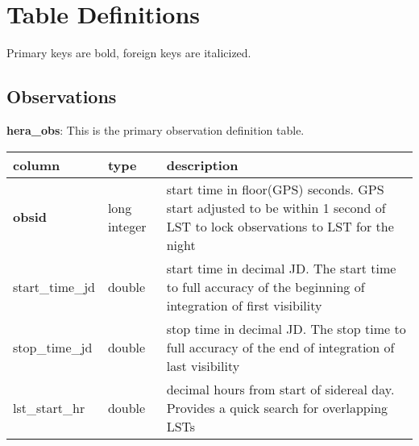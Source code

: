 \documentclass{article}
\begin{document}
\section{Table Definitions}
Primary keys are bold, foreign keys are italicized.

\subsection{Observations}
\textbf{\large{hera\_obs}}: This is the primary observation definition table.
\begin{center}
 \begin{tabular}{| p{4cm} | p{2cm} | p{10cm} |} 
 \hline
 column & type & description \\ [0.5ex]  \hline\hline
 \textbf{obsid} & long integer & start time in floor(GPS) seconds. GPS start adjusted to be within 1 second of LST to lock observations to LST for the night \\ \hline
 start\_time\_jd & double & start time in decimal JD. The start time to full accuracy of the beginning of integration of first visibility \\\hline
 stop\_time\_jd & double & stop time in decimal JD. The stop time to full accuracy of the end of integration of last visibility \\\hline
 lst\_start\_hr & double & decimal hours from start of sidereal day. Provides a quick search for overlapping LSTs \\\hline
 \end{tabular}
\end{center}
\end{document}
